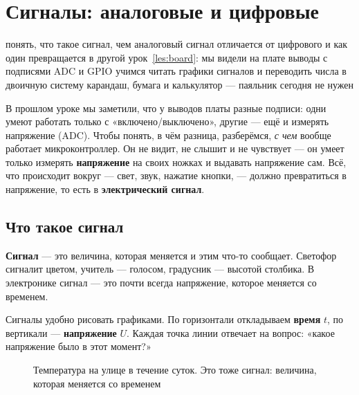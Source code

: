 \section{Сигналы: аналоговые и цифровые}
\label{les:signals}
\lessonintro
  {понять, что такое сигнал, чем аналоговый сигнал отличается от цифрового и как один превращается в другой}
  {урок~\ref{les:board}: мы видели на плате выводы с подписями ADC и GPIO}
  {учимся читать графики сигналов и переводить числа в двоичную систему}
  {карандаш, бумага и калькулятор --- паяльник сегодня не нужен}

В прошлом уроке мы заметили, что у выводов платы разные подписи: одни умеют работать только
с «включено/выключено», другие --- ещё и измерять напряжение (ADC). Чтобы понять, в чём разница,
разберёмся, \emph{с чем} вообще работает микроконтроллер. Он не видит, не слышит и не чувствует --- он умеет только измерять
\textbf{напряжение} на своих ножках и выдавать напряжение сам. Всё, что происходит вокруг ---
свет, звук, нажатие кнопки, --- должно превратиться в напряжение, то есть в \textbf{электрический сигнал}.

\subsection{Что такое сигнал}

\textbf{Сигнал} --- это величина, которая меняется и этим что-то сообщает. Светофор сигналит цветом,
учитель --- голосом, градусник --- высотой столбика. В электронике сигнал --- это почти всегда
напряжение, которое меняется со временем.

Сигналы удобно рисовать графиками. По горизонтали откладываем \textbf{время} $t$, по вертикали ---
\textbf{напряжение} $U$. Каждая точка линии отвечает на вопрос: «какое напряжение было в этот момент?»

\begin{figure}[H]
\centering
{}
\caption{Температура на улице в течение суток. Это тоже сигнал: величина, которая меняется со временем}
\end{figure}

